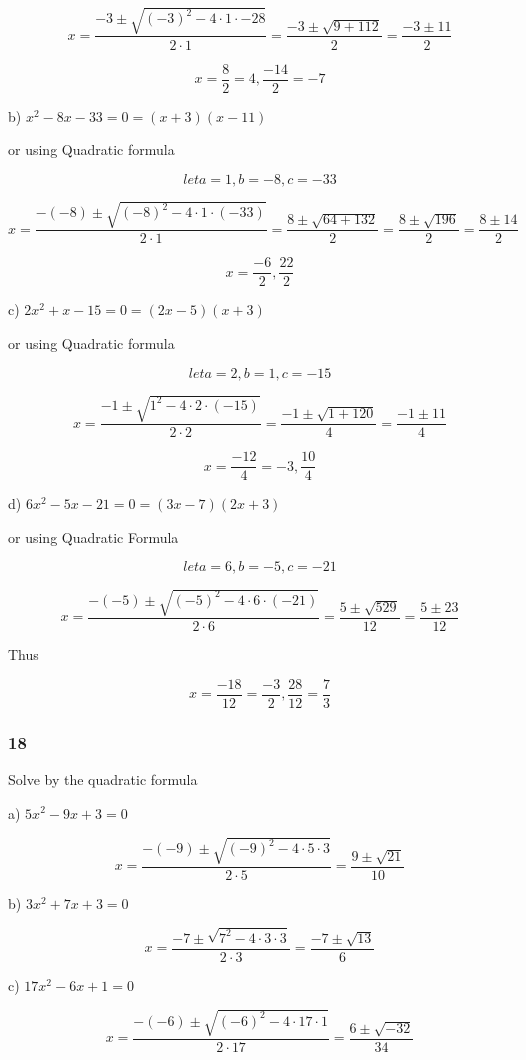 \documentclass[]{report}
\begin{document}
\[
x = \frac{-3 \pm \sqrt{(-3)^2 - 4\cdot1\cdot-28}}{2\cdot1} = \frac{-3 \pm \sqrt{9 + 112}}{2} = \frac{-3 \pm 11}{2}
\]

\[
x = \frac{8}{2} = 4 ,  \frac{-14}{2} = -7
\]

b) $x^2 - 8x - 33 = 0 = (x + 3)(x - 11)$

or using Quadratic formula

\[
let a=1, b=-8, c= -33
\]

\[
x = \frac{-(-8) \pm \sqrt{(-8)^2 - 4\cdot1\cdot(-33)}}{2\cdot1} = \frac{8 \pm \sqrt{64  + 132}}{2} = \frac{8 \pm \sqrt{196}}{2} = \frac{8 \pm 14}{2}
\]

\[
x = \frac{-6}{2}, \frac{22}{2}
\]



c) $2x^2 + x -15 = 0 = (2x - 5)(x + 3)$


or  using Quadratic formula

\[
let a=2, b=1, c=-15
\]

\[
x = \frac{-1 \pm \sqrt{1^2 - 4\cdot2\cdot(-15)}}{2\cdot2} = \frac{-1 \pm \sqrt{1 + 120}}{4} = \frac{-1 \pm 11}{4}
\]

\[
x = \frac{-12}{4} = -3, \frac{10}{4}
\]

d) $6x^2 - 5x -21 = 0 = (3x - 7)(2x + 3)$

or using Quadratic Formula

\[
let a=6, b=-5, c=-21
\]

\[
x = \frac{-(-5) \pm \sqrt{(-5)^2 - 4\cdot6\cdot(-21)}}{2\cdot6} = \frac{5 \pm \sqrt{529}}{12} = \frac{5 \pm 23}{12}
\]

Thus

\[
x=\frac{-18}{12} = \frac{-3}{2}, \frac{28}{12} = \frac{7}{3}
\]



\subsubsection{18}

Solve by the quadratic formula

a) $5x^2 - 9x + 3 = 0 $

\[
x = \frac{-(-9) \pm \sqrt{(-9)^2 - 4\cdot5\cdot3}}{2\cdot5} = \frac{9 \pm \sqrt{21}}{10}
\]

b) $3x^2 + 7x + 3 = 0$

\[
x = \frac{-7 \pm \sqrt{7^2 - 4\cdot3\cdot3}}{2\cdot3} = \frac{-7 \pm \sqrt{13}}{6}
\]

c) $17x^2 - 6x + 1 = 0$

\[
x = \frac{-(-6) \pm \sqrt{(-6)^2 - 4\cdot17\cdot1}}{2\cdot17} = \frac{6 \pm \sqrt{-32}}{34}
\]
\end{document}
